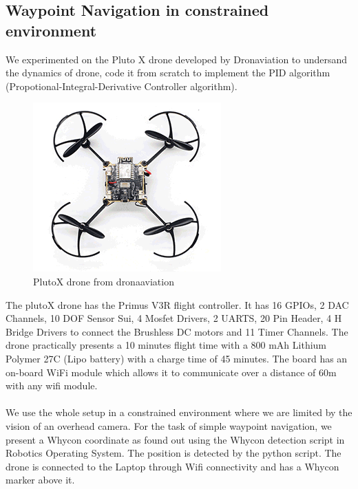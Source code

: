 \subsection{Waypoint Navigation in constrained environment}
We experimented on the Pluto X drone developed by Dronaviation to undersand the dynamics of drone, code it from scratch to implement the PID algorithm (Propotional-Integral-Derivative Controller algorithm). 
\begin{figure}[H]
    \centering
    \includegraphics[]{SummerInterReport/project/Images-Major/plutox.png}
    \caption{PlutoX drone from dronaaviation}
    \label{fig:plutox}
\end{figure}
The plutoX drone has the Primus V3R flight controller. It has 16 GPIOs, 2 DAC Channels, 10 DOF Sensor Sui, 4 Mosfet Drivers, 2 UARTS, 20 Pin Header, 4 H Bridge Drivers to connect the Brushless DC motors and 11 Timer Channels. The drone practically presents a 10 minutes flight time with a 800 mAh Lithium Polymer 27C (Lipo battery) with a charge time of 45 minutes. The board has an on-board WiFi module which allows it to communicate over a distance of 60m with any wifi module. 
\\
\\
We use the whole setup in a constrained environment where we are limited by the vision of an overhead camera. For the task of simple waypoint navigation, we present a Whycon coordinate as found out using the Whycon detection script in Robotics Operating System. The position is detected by the python script. The drone is connected to the Laptop through Wifi connectivity and has a Whycon marker above it.
